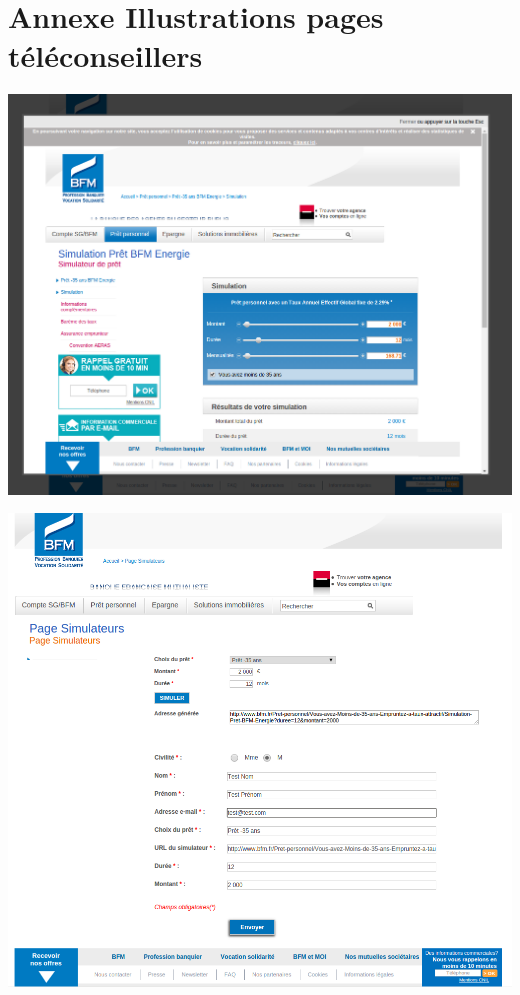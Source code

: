 \documentclass[a4paper,11pt,twoside]{report}
\begin{document}
  \section*{Annexe Illustrations pages téléconseillers}
  \label{illustrations_pages_teleconseillers}
  \begin{center}
      \includegraphics[width=\textwidth]{images/page_teleconseille2.png} 
      \label{page_teleconseille_popin_simulation}
  \end{center}
  \begin{center}
    \includegraphics[width=\textwidth]{images/page_teleconseille3.png} 
    \label{page_teleconseille_formulaire_prerempli}
  \end{center}
  
\end{document}
